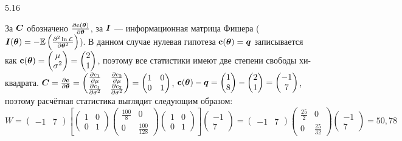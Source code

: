 \begin{solution}{{5.16}}
\begin{enumerate}
За $\boldsymbol{C}$ обозначено $\frac{\partial \mathbf{c}(\boldsymbol{\theta})}{\partial \boldsymbol{\theta}}$, за $\boldsymbol{I}$ — информационная матрица Фишера ($\boldsymbol{I}(\boldsymbol{\theta}) = -\mathbb{E}\left( \frac{\partial^2 \ln \mathcal{L}}{\partial \boldsymbol{\theta}^2} \right)$). В данном случае нулевая гипотеза $\mathbf{c}(\boldsymbol{\theta}) = \boldsymbol{q}$ записывается как $\mathbf{c}({\boldsymbol{\theta}}) = \begin{pmatrix} \mu \\ \sigma^2 \end{pmatrix} = \begin{pmatrix} 2 \\ 1 \end{pmatrix}$, поэтому все статистики имеют две степени свободы хи-квадрата. $\boldsymbol{C} = \frac{\partial  \mathbf{c}}{\partial \boldsymbol{\theta}} = \begin{pmatrix} \frac{\partial  c_1}{\partial \mu} & \frac{\partial  c_2}{\partial \mu} \\ \frac{\partial  c_1}{\partial \sigma^2} & \frac{\partial  c_2}{\partial \sigma^2} \end{pmatrix} =  \begin{pmatrix} 1 & 0 \\ 0 & 1 \end{pmatrix}$, $\mathbf{c}(\boldsymbol{\theta}) - \boldsymbol{q}  = \begin{pmatrix} 1 \\ 8 \end{pmatrix} - \begin{pmatrix} 2 \\ 1 \end{pmatrix} = \begin{pmatrix} -1 \\ 7 \end{pmatrix}$, поэтому расчётная статистика выглядит следующим образом:
\[
W = \begin{pmatrix} -1 & 7 \end{pmatrix} \left[ \begin{pmatrix} 1 & 0 \\ 0 & 1 \end{pmatrix} \begin{pmatrix} \frac{100}{8} & 0 \\ 0 & \frac{100}{128}  \end{pmatrix} \begin{pmatrix} 1 & 0 \\ 0 & 1 \end{pmatrix} \right] \begin{pmatrix} -1  \\  7 \end{pmatrix} =
\begin{pmatrix} -1 & 7 \end{pmatrix} \begin{pmatrix} \frac{25}{2} & 0 \\ 0 & \frac{25}{32} \end{pmatrix} \begin{pmatrix} -1  \\  7 \end{pmatrix} = 50{,}78
\]


\end{enumerate}
\end{solution}
